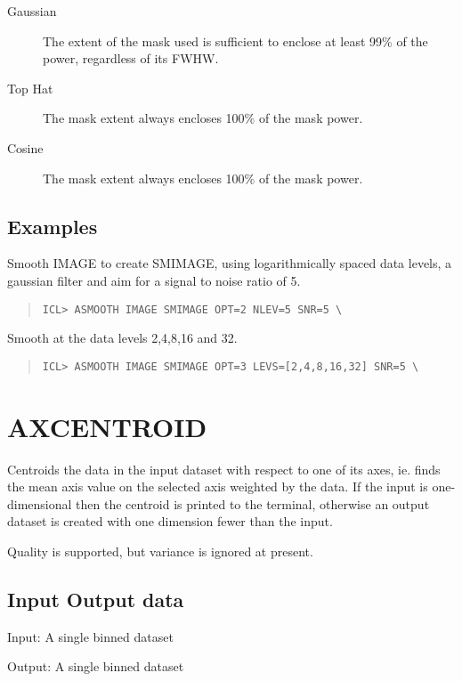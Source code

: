 \documentclass{book}
\renewcommand{\_}{{\tt\char'137}}     %
\begin{document}
 
\begin{description}
\item[Gaussian]
The extent of the mask used is sufficient
to enclose at least 99\% of the power, regardless of
its FWHW.
\item[Top Hat]
The mask extent always encloses 100\% of
the mask power.
\item[Cosine]
The mask extent always encloses 100\% of
the mask power.
\end{description}
\subsection{Examples}
Smooth IMAGE to create SMIMAGE, using logarithmically spaced
data levels, a gaussian filter and aim for a signal to noise
ratio of 5.
 
\begin{quote}\begin{verbatim}
ICL> ASMOOTH IMAGE SMIMAGE OPT=2 NLEV=5 SNR=5 \
\end{verbatim}\end{quote}
Smooth at the data levels 2,4,8,16 and 32.
 
\begin{quote}\begin{verbatim}
ICL> ASMOOTH IMAGE SMIMAGE OPT=3 LEVS=[2,4,8,16,32] SNR=5 \
\end{verbatim}\end{quote}
\section{AXCENTROID}
Centroids the data in the input dataset with respect to one of its
axes, ie. finds the mean axis value on the selected axis weighted by
the data. If the input is one-dimensional then the centroid is printed
to the terminal, otherwise an output dataset is created with one
dimension fewer than the input.
 
Quality is supported, but variance is ignored at present.
 
\subsection{Input Output data}
Input: A single binned dataset
 
Output: A single binned dataset
 
\end{document}
